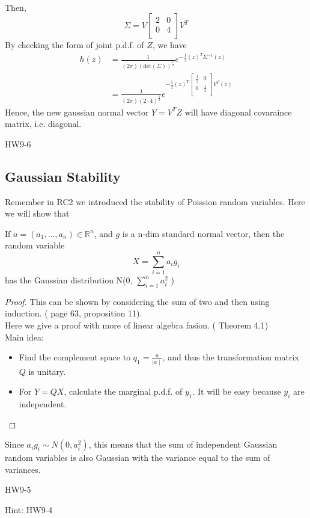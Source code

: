     \\
    Then,
    \[
        \Sigma = V \begin{bmatrix}
            2 &  0 \\
            0 &  4 \\
        \end{bmatrix} V^T 
    \] 
    By checking the form of joint p.d.f. of \(Z\), we have  
 \begin{equation}
    \begin{aligned}
    h(z) &= \frac{1}{(2\pi) (\text{det}(\Sigma) )^{\frac{1}{2}}} e^{-\frac{1}{2} (z)^T \Sigma ^{-1} (z) }
     \\ &= \frac{1}{(2\pi) (2 \cdot 4 )^{\frac{1}{2}}} e^{-\frac{1}{2} (z)^T \begin{bmatrix}
        \frac{1}{2} & 0  \\
        0 & \frac{1}{4}  \\
    \end{bmatrix} V^T (z) }
    \end{aligned}
 \end{equation}
 Hence, the new gaussian normal vector \(Y = V^T Z\) will have diagonal covaraince matrix, i.e. diagonal. 
   
\begin{exercise}
    HW9-6
\end{exercise}


\subsection*{Gaussian Stability}
Remember in RC2 we introduced the stability of Poission random variables.  Here we will show that
\begin{theorem}

If \(a = (a_1, \dots, a_n) \in \mathbb{R}^n\), and \(g\) is a n-dim standard normal vector, then the random variable 
\[
    X = \sum_{i=1}^{n} a_i g_i
\]
has the Gaussian distribution N(0, \(\sum_{i=1}^{n}a_i^2 \) )
\end{theorem} 
\begin{proof}
    This can be shown by considering the sum of two and then using induction. (\cite{Und_Chatterjee} page 63, proposition 11).\\ 
    Here we give a proof with more of linear algebra fasion. (\cite*{IntroPanchenko} Theorem 4.1)
    \\ Main idea:
    \begin{itemize}
        \item Find the complement space to \(q_1 = \frac{a}{\mid a\mid }\), and thus the transformation matrix \(Q\) is unitary.  
        \item For \(Y = QX\), calculate the marginal p.d.f. of \(y_1\). It will be easy because \(y_i\) are independent.   
    \end{itemize}
\end{proof}
Since \(a_{i}g_i \sim N(0,a_i^2) \), this means that the sum of independent
Gaussian random variables is also Gaussian with the
variance equal to the sum of variances.

\begin{exercise}
    HW9-5
\end{exercise}
Hint: HW9-4